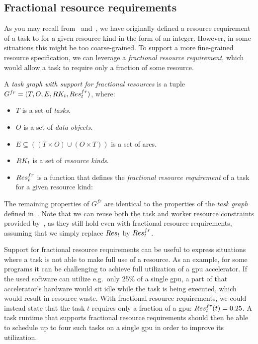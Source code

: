 \subsection{Fractional resource requirements}
As you may recall from~ and~, we have originally
defined a resource requirement of a task to for a given resource kind in the form of an integer.
However, in some situations this might be too coarse-grained. To support a more fine-grained
resource specification, we can leverage a \emph{fractional resource requirement}, which would allow a task to
require only a fraction of some resource.

\vspace{2mm} A
\emph{task graph with support for fractional resources} is a tuple \\
$G^{fr} = (T, O, E, RK_t, Res_t^{fr})$, where:
\begin{itemize}[itemsep=0pt]
	\item $T$ is a set of \emph{tasks}.
	\item $O$ is a set of \emph{data objects}.
	\item $E \subseteq ((T\times{}O) \cup (O\times{}T))$ is a set of arcs.
	\item $RK_t$ is a set of \emph{resource kinds}.
	\item $Res_t^{fr}$ is a function that defines the
	      \emph{fractional resource requirement} of a task for a given resource kind: \\
\end{itemize}

The remaining properties of $G^{fr}$ are identical to the properties of the
\emph{task graph} defined in~. Note that we can reuse both the task
and worker resource constraints provided by~, as they still
hold even with fractional resource requirements, assuming that we simply replace $Res_t$ by
$Res_t^{fr}$.

Support for fractional resource requirements can be useful to express situations where a task is
not able to make full use of a resource. As an example, for some programs it can be challenging to
achieve full utilization of a \gls{gpu} accelerator. If the used software can utilize
e.g.\ only 25\% of a single \gls{gpu}, a part of that accelerator's hardware would
sit idle while the task is being executed, which would result in resource waste. With fractional
resource requirements, we could instead state that the task $t$ requires only a
fraction of a \gls{gpu}: $Res_t^{fr}(t) = 0.25$. A task runtime that supports
fractional resource requirements should then be able to schedule up to four such tasks on a single
\gls{gpu} in order to improve its utilization.

